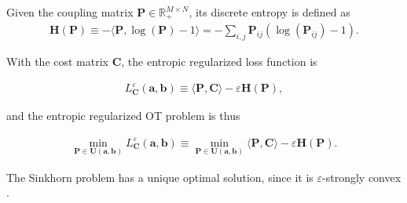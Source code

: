 \begin{problem}\label{thm:entropic-regularized-OT-problem}
Given the coupling matrix $\mathbf{P} \in \mathbb{R}_+^{M \times N}$, its discrete entropy is defined as
\begin{equation*}
  \begin{aligned}
    \mathbf{H}(\mathbf{P})
    \equiv - \langle \mathbf{P}, \log(\mathbf{P}) - 1\rangle
    = - \sum_{i,j} \mathbf{P}_{ij} (\log(\mathbf{P}_{ij}) - 1).
  \end{aligned}
\end{equation*}

With the cost matrix $\mathbf{C}$, the entropic regularized loss function is

\begin{equation}\label{eqn:entropic-regularized-OT-loss}
  \begin{aligned}
    L^\varepsilon_{\mathbf{C}}(\mathbf{a}, \mathbf{b})
    \equiv
    \langle \mathbf{P}, \mathbf{C}\rangle - \varepsilon \mathbf{H}(\mathbf{P}),
  \end{aligned}
\end{equation}

and the entropic regularized OT problem is thus

\begin{equation}\label{eqn:entropic-regularized-OT-problem}
  \begin{aligned}
    \min_{\mathbf{P} \in \mathbf{U}(\mathbf{a},\mathbf{b})}
    L^\varepsilon_{\mathbf{C}}(\mathbf{a}, \mathbf{b})
    \equiv
    \min_{\mathbf{P} \in \mathbf{U}(\mathbf{a},\mathbf{b})}
    \langle \mathbf{P}, \mathbf{C}\rangle - \varepsilon \mathbf{H}(\mathbf{P}).
  \end{aligned}
\end{equation}
\end{problem}

The Sinkhorn problem has a unique optimal solution, since it is $\varepsilon$-strongly convex \citep{peyre2019}.

